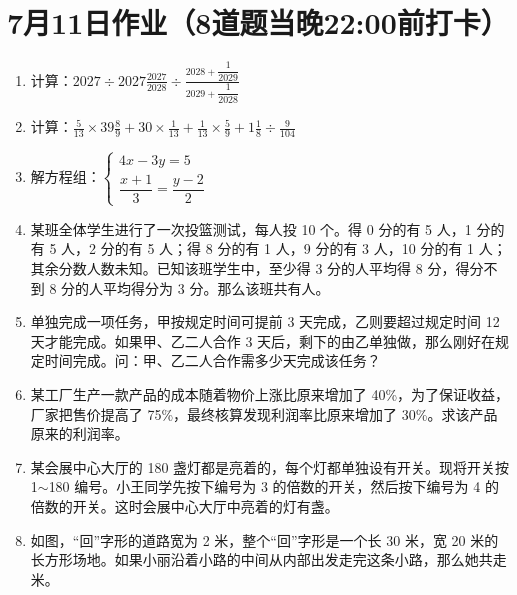 \documentclass[UTF8,12pt,a4paper]{ctexart}
\newcommand{\BottomWriteSpace}{0.5cm}
\newenvironment{OnePageEightFill}{
  \small
  \vspace*{0pt}
  \begin{enumerate}[leftmargin=*, itemsep=0pt, topsep=0pt, parsep=0pt, partopsep=0pt]
  \setlength{\parskip}{0pt}
}{
  \end{enumerate}
  \vspace*{\BottomWriteSpace}
  \normalsize
  \newpage
}
\newcommand{\Q}[1]{\item #1\par\vfill}
\newcommand{\Qlast}[1]{\item #1\par}
\begin{document}
\section*{7月11日作业（8道题当晚22:00前打卡）}
\begin{OnePageEightFill}

\Q{计算：$\displaystyle 2027 \div 2027\frac{2027}{2028} \div \frac{2028 + \dfrac{1}{2029}}{2029 + \dfrac{1}{2028}}$}

\Q{计算：$\displaystyle \frac{5}{13} \times 39\frac{8}{9} + 30 \times \frac{1}{13} + \frac{1}{13} \times \frac{5}{9} + 1\frac{1}{8} \div \frac{9}{104}$}

\Q{解方程组：$\begin{cases} 4x - 3y = 5 \\ \dfrac{x+1}{3} = \dfrac{y-2}{2} \end{cases}$}

\Q{某班全体学生进行了一次投篮测试，每人投 10 个。得 0 分的有 5 人，1 分的有 5 人，2 分的有 5 人；得 8 分的有 1 人，9 分的有 3 人，10 分的有 1 人；其余分数人数未知。已知该班学生中，至少得 3 分的人平均得 8 分，得分不到 8 分的人平均得分为 3 分。那么该班共有\underline{\hspace{3em}}人。}

\Q{单独完成一项任务，甲按规定时间可提前 3 天完成，乙则要超过规定时间 12 天才能完成。如果甲、乙二人合作 3 天后，剩下的由乙单独做，那么刚好在规定时间完成。问：甲、乙二人合作需多少天完成该任务？}

\Q{某工厂生产一款产品的成本随着物价上涨比原来增加了 40\%，为了保证收益，厂家把售价提高了 75\%，最终核算发现利润率比原来增加了 30\%。求该产品原来的利润率。}

\Q{某会展中心大厅的 180 盏灯都是亮着的，每个灯都单独设有开关。现将开关按 1$\sim$180 编号。小王同学先按下编号为 3 的倍数的开关，然后按下编号为 4 的倍数的开关。这时会展中心大厅中亮着的灯有\underline{\hspace{3em}}盏。}

\Qlast{如图，“回”字形的道路宽为 2 米，整个“回”字形是一个长 30 米，宽 20 米的长方形场地。如果小丽沿着小路的中间从内部出发走完这条小路，那么她共走\underline{\hspace{3em}}米。}

\end{OnePageEightFill}

\end{document}
